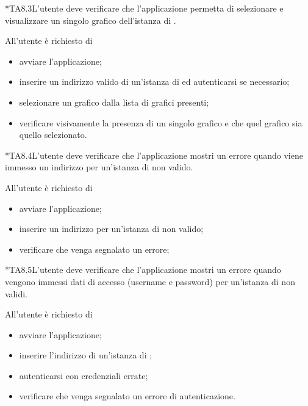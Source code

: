 	*{TA8.3}L'utente deve verificare che l'applicazione  permetta di selezionare e visualizzare un singolo grafico dell'istanza di \projectname{}.

		All'utente è richiesto di
		\begin{itemize}
			\item avviare l'applicazione;
			\item inserire un indirizzo valido di un'istanza di \projectname{} ed autenticarsi se necessario;
			\item selezionare un grafico dalla lista di grafici presenti;
			\item verificare visivamente la presenza di un singolo grafico e che quel grafico sia quello selezionato.
		\end{itemize}

	*{TA8.4}L'utente deve verificare che l'applicazione  mostri un errore quando viene immesso un indirizzo per un'istanza di \projectname{} non valido.

		All'utente è richiesto di
		\begin{itemize}
			\item avviare l'applicazione;
			\item inserire un indirizzo per un'istanza di \projectname{} non valido;
			\item verificare che venga segnalato un errore;
		\end{itemize}

	*{TA8.5}L'utente deve verificare che l'applicazione  mostri un errore quando vengono immessi dati di accesso (username e password) per un'istanza di \projectname{} non validi.

		All'utente è richiesto di
		\begin{itemize}
			\item avviare l'applicazione;
			\item inserire l'indirizzo di un'istanza di \projectname{};
			\item autenticarsi con credenziali errate;
			\item verificare che venga segnalato un errore di autenticazione.
		\end{itemize}
